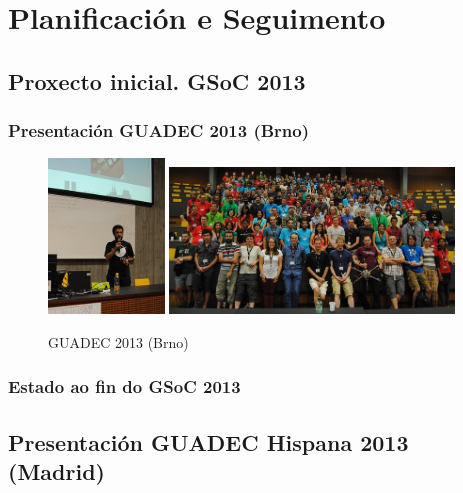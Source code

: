 \chapter{Planificación e Seguimento}


\section{Proxecto inicial. GSoC 2013}


\subsection{Presentación GUADEC 2013 (Brno)}

\begin{figure}[h!]
    \centering
    \includegraphics[width=0.275\textwidth]{img/guadec_2013_1.jpg}
    \includegraphics[width=0.675\textwidth]{img/guadec_2013_2.jpg}
    \caption{GUADEC 2013 (Brno)}
    \label{fig:guadec2012}
\end{figure}

\subsection{Estado ao fin do GSoC 2013}

\section{Presentación GUADEC Hispana 2013 (Madrid)}

